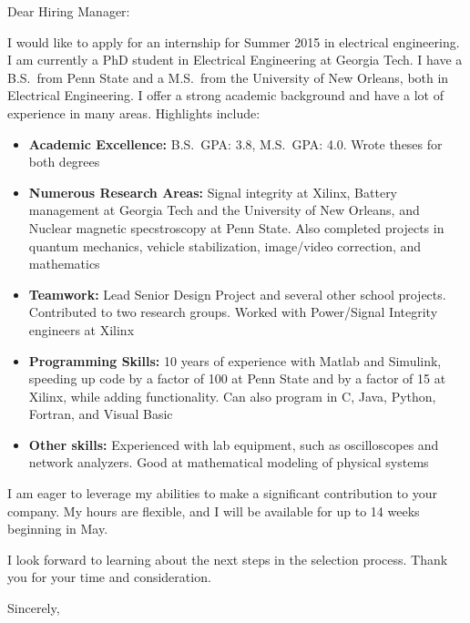 \documentclass[11pt]{letter}
\makeatletter
\renewcommand{\closing}[1]{\par\nobreak\vspace{\parskip}%
  \stopbreaks
  \noindent
  \ifx\@empty\fromaddress\else
  \hspace*{\longindentation}\fi
  \parbox{\indentedwidth}{\raggedright
       \ignorespaces #1\\[2\medskipamount]%
       \ifx\@empty\fromsig
           \fromname
       \else \fromsig \fi\strut}%
   \par}
\makeatother
\begin{document}
\begin{letter}{}
\opening{Dear Hiring Manager:}

I would like to apply for an internship for Summer 2015 in electrical engineering.
%
I am currently a PhD student in Electrical Engineering at Georgia Tech. I have a B.S.\ from Penn State and a M.S.\ from the University of New Orleans, both in Electrical Engineering. I offer a strong academic background and have a lot of experience in many areas. Highlights include:

\begin{itemize}
    \item \textbf{Academic Excellence:} B.S.\ GPA: 3.8, M.S.\ GPA: 4.0. Wrote theses for both degrees
    \item \textbf{Numerous Research Areas:} Signal integrity at Xilinx, Battery management at Georgia Tech and the University of New Orleans, and Nuclear magnetic specstroscopy at Penn State. Also completed projects in quantum mechanics, vehicle stabilization, image/video correction, and mathematics
    \item \textbf{Teamwork:} Lead Senior Design Project and several other school projects. Contributed to two research groups. Worked with Power/Signal Integrity engineers at Xilinx
    \item \textbf{Programming Skills:} 10 years of experience with Matlab and Simulink, speeding up code by a factor of 100 at Penn State and by a factor of 15 at Xilinx, while adding functionality. Can also program in C, Java, Python, Fortran, and Visual Basic
    \item \textbf{Other skills:} Experienced with lab equipment, such as oscilloscopes and network analyzers. Good at mathematical modeling of physical systems
\end{itemize}

I am eager to leverage my abilities to make a significant contribution to your company. My hours are flexible, and I will be available for up to 14 weeks beginning in May.

I look forward to learning about the next steps in the selection process. Thank you for your time and consideration.

\closing{Sincerely,}

\end{letter}
\end{document}
